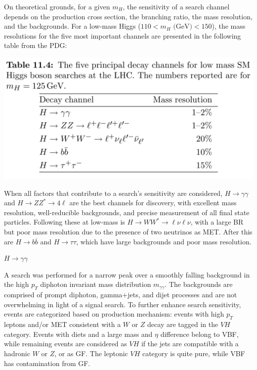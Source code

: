 On theoretical grounds, for a given $m_H$, the sensitivity of a search channel depends on the production cross section, the branching ratio, the mass resolution, and the backgrounds. For a low-mass Higgs ($110<m_H\text{ (GeV)}<150$), the mass resolutions for the five most important channels are presented in the following table from the PDG:

\begin{center}
    \includegraphics[scale=0.4]{physics/images/higgs_mass_resolution}
\end{center}
When all factors that contribute to a search's sensitivity are considered, $H\rightarrow \gamma \gamma$ and $H\rightarrow ZZ^*\rightarrow 4\ell$ are the best channels for discovery, with excellent mass resolution, well-reducible backgrounds, and precise measurement of all final state particles. Following these at low-mass is $H \rightarrow WW^* \rightarrow \ell \nu \ell \nu$, with a large BR but poor mass resolution due to the presence of two neutrinos as MET. After this are $H\rightarrow b\overline{b}$ and $H\rightarrow \tau \tau$, which have large backgrounds and poor mass resolution.

\vspace{1em}
\vspace{1em}
\noindent \underline{$H \rightarrow \gamma \gamma$}

\vspace{1em}
\noindent A search was performed for a narrow peak over a smoothly falling background in the high $p_T$ diphoton invariant mass distribution $m_{\gamma \gamma}$. The backgrounds are comprised of prompt diphoton, gamma+jets, and dijet processes and are not overwhelming in light of a signal search. To further enhance search sensitivity, events are categorized based on production mechanism: events with high $p_T$ leptons and/or MET consistent with a $W$ or $Z$ decay are tagged in the $VH$ category. Events with diets and a large mass and $\eta$ difference belong to VBF, while remaining events are considered as $VH$ if the jets are compatible with a hadronic $W$ or $Z$, or as GF. The leptonic $VH$ category is quite pure, while VBF has contamination from GF.


